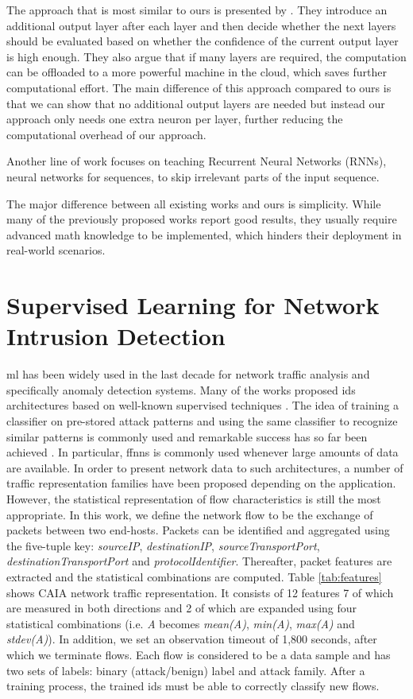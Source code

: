\documentclass[conference]{IEEEtran}
\begin{document}
The approach that is most similar to ours is presented by \cite{leroux_cascading_2017}. They introduce an additional output layer after each layer and then decide whether the next layers should be evaluated based on whether the confidence of the current output layer is high enough. They also argue that if many layers are required, the computation can be offloaded to a more powerful machine in the cloud, which saves further computational effort. The main difference of this approach compared to ours is that we can show that no additional output layers are needed but instead our approach only needs one extra neuron per layer, further reducing the computational overhead of our approach.

Another line of work \cite{seo_neural_2018, yu_learning_2017, graves_adaptive_2017, bachl_sparseids_2020} focuses on teaching Recurrent Neural Networks (RNNs), neural networks for sequences, to skip irrelevant parts of the input sequence.

The major difference between all existing works and ours is simplicity. While many of the previously proposed works report good results, they usually require advanced math knowledge to be implemented, which hinders their deployment in real-world scenarios.

\section{Supervised Learning for Network Intrusion Detection}

\gls{ml} has been widely used in the last decade for network traffic analysis and specifically anomaly detection systems. Many of the works proposed \gls{ids} architectures based on well-known supervised techniques \cite{survey}. The idea of training a classifier on pre-stored attack patterns and using the same classifier to recognize similar patterns is commonly used and remarkable success has so far been achieved \cite{survey}. In particular, \glspl{ffnn} is commonly used whenever large amounts of data are available. In order to present network data to such architectures, a number of traffic representation families have been proposed depending on the application. However, the statistical representation of flow characteristics is still the most appropriate. In this work, we define the network flow to be the exchange of packets between two end-hosts. Packets can be identified and aggregated using the five-tuple key: \emph{sourceIP}, \emph{destinationIP}, \emph{sourceTransportPort}, \emph{destinationTransportPort} and \emph{protocolIdentifier}. Thereafter, packet features are extracted and the statistical combinations are computed. Table \ref{tab:features} shows CAIA \cite{williams_preliminary_2006} network traffic representation. It consists of 12 features 7 of which are measured in both directions and 2 of which are expanded using four statistical combinations (i.e. \emph{A} becomes \emph{mean(A)}, \emph{min(A)}, \emph{max(A)} and \emph{stdev(A)}). In addition, we set an observation timeout of 1,800 seconds, after which we terminate flows. Each flow is considered to be a data sample and has two sets of labels: binary (attack/benign) label and attack family. After a training process, the trained \gls{ids} must be able to correctly classify new flows.
\end{document}
